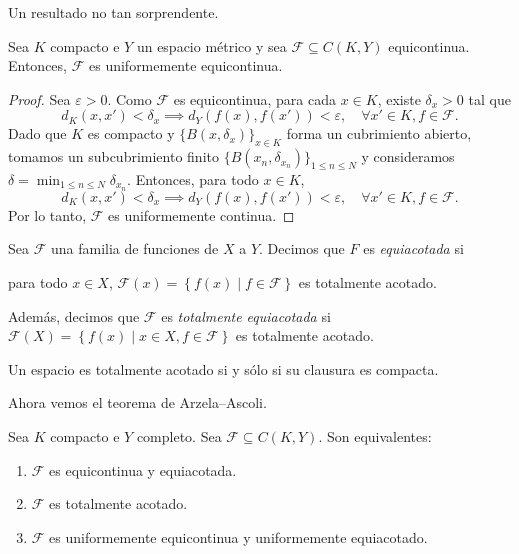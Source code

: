 Un resultado no tan sorprendente.

\begin{proposition}
	Sea $K$ compacto e $Y$ un espacio métrico y sea $\mathcal{F} \subseteq C(K, Y)$ equicontinua. Entonces, $\mathcal{F}$ es uniformemente equicontinua.
\end{proposition}

\begin{proof}
	Sea $\varepsilon > 0$. Como $\mathcal{F}$ es equicontinua, para cada $x \in K$, existe $\delta_x > 0$ tal que
	\begin{equation*}
		d_K(x, x') < \delta_x \implies d_Y(f(x), f(x')) < \varepsilon, \quad \forall x' \in K, f \in \mathcal{F}.
	\end{equation*}
	Dado que $K$ es compacto y $\{B(x, \delta_x)\}_{x \in K}$ forma un cubrimiento abierto, tomamos un subcubrimiento finito $\{B(x_n, \delta_{x_n})\}_{1 \leq n \leq N}$ y consideramos $\delta = \min_{1 \leq n \leq N} \delta_{x_n}$. Entonces, para todo $x \in K$,
	\begin{equation*}
		d_K(x, x') < \delta_x \implies d_Y(f(x), f(x')) < \varepsilon, \quad \forall x' \in K, f \in \mathcal{F}.
	\end{equation*}
	Por lo tanto, $\mathcal{F}$ es uniformemente continua.
\end{proof}

\begin{definition}
	Sea $\mathcal{F}$ una familia de funciones de $X$ a $Y$. Decimos que $F$ es \emph{equiacotada} si
	\begin{center}
		para todo $x \in X$, $\mathcal{F}(x) = \left\{ f(x) \mid f \in \mathcal{F} \right\}$ es totalmente acotado.
	\end{center}
	Además, decimos que $\mathcal{F}$ es \emph{totalmente equiacotada} si $\mathcal{F}(X) = \left\{ f(x) \mid x \in X, f \in \mathcal{F} \right\}$ es totalmente acotado.
\end{definition}

\begin{remark}
	Un espacio es totalmente acotado si y sólo si su clausura es compacta.
\end{remark}

Ahora vemos el teorema de Arzela--Ascoli.

\begin{theorem}
	Sea $K$ compacto e $Y$ completo. Sea $\mathcal{F} \subseteq C(K, Y)$. Son equivalentes:
	\begin{enumerate}
		\item $\mathcal{F}$ es equicontinua y equiacotada.
		\item $\mathcal{F}$ es totalmente acotado.
		\item $\mathcal{F}$ es uniformemente equicontinua y uniformemente equiacotado.
	\end{enumerate}
\end{theorem}

